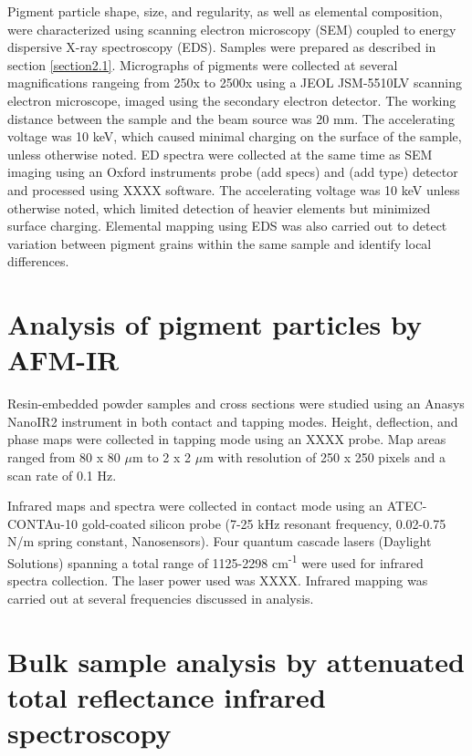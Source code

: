 Pigment particle shape, size, and regularity, as well as elemental composition, were characterized using scanning electron microscopy (SEM) coupled to energy dispersive X-ray spectroscopy (EDS). Samples were prepared as described in section \ref{section2.1}. Micrographs of pigments were collected at several magnifications rangeing from 250x to 2500x using a JEOL JSM-5510LV scanning electron microscope, imaged using the secondary electron detector. The working distance between the sample and the beam source was 20 mm. The accelerating voltage was 10 keV, which caused minimal charging on the surface of the sample, unless otherwise noted. ED spectra were collected at the same time as SEM imaging using an Oxford instruments probe (add specs) and (add type) detector and processed using XXXX software. The accelerating voltage was 10 keV unless otherwise noted, which limited detection of heavier elements but minimized surface charging. Elemental mapping using EDS was also carried out to detect variation between pigment grains within the same sample and identify local differences. 


\section[Analysis of pigment particles by AFM-IR]{Analysis of pigment particles by AFM-IR}
\label{section2.4}

Resin-embedded powder samples and cross sections were studied using an Anasys NanoIR2 instrument in both contact and tapping modes. Height, deflection, and phase maps were collected in tapping mode using an XXXX probe. Map areas ranged from 80 x 80 $\mu$m to 2 x 2 $\mu$m with resolution of 250 x 250 pixels and a scan rate of 0.1 Hz. 

Infrared maps and spectra were collected in contact mode using an ATEC-CONTAu-10 gold-coated silicon probe (7-25 kHz resonant frequency, 0.02-0.75 N/m spring constant, Nanosensors). Four quantum cascade lasers (Daylight Solutions) spanning a total range of 1125-2298 cm\textsuperscript{-1} were used for infrared spectra collection. The laser power used was XXXX. Infrared mapping was carried out at several frequencies discussed in analysis.


\section[Bulk sample analysis by ATR FT-IR]{Bulk sample analysis by attenuated total reflectance infrared spectroscopy}
\label{section2.5}

